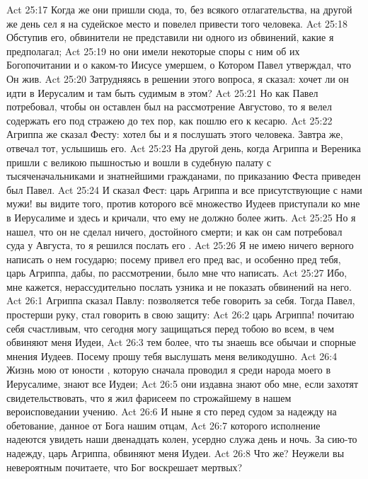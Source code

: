 \vs Act 25:17 Когда же они пришли сюда, то, без всякого отлагательства, на другой же день сел я на судейское место и повелел привести того человека.
\vs Act 25:18 Обступив его, обвинители не представили ни одного из обвинений, какие я предполагал;
\vs Act 25:19 но они имели некоторые споры с ним об их Богопочитании и о каком-то Иисусе умершем, о Котором Павел утверждал, что Он жив.
\vs Act 25:20 Затрудняясь в решении этого вопроса, я сказал: хочет ли он идти в Иерусалим и там быть судимым в этом?
\vs Act 25:21 Но как Павел потребовал, чтобы он оставлен был на рассмотрение Августово, то я велел содержать его под стражею до тех пор, как пошлю его к кесарю.
\vs Act 25:22 Агриппа же сказал Фесту: хотел бы и я послушать этого человека. Завтра же, отвечал тот, услышишь его.
\rsbpar\vs Act 25:23 На другой день, когда Агриппа и Вереника пришли с великою пышностью и вошли в судебную палату с тысяченачальниками и знатнейшими гражданами, по приказанию Феста приведен был Павел.
\vs Act 25:24 И сказал Фест: царь Агриппа и все присутствующие с нами мужи! вы видите того, против которого всё множество Иудеев приступали ко мне в Иерусалиме и здесь и кричали, что ему не должно более жить.
\vs Act 25:25 Но я нашел, что он не сделал ничего, достойного смерти; и как он сам потребовал суда у Августа, то я решился послать его .
\vs Act 25:26 Я не имею ничего верного написать о нем государю; посему привел его пред вас, и особенно пред тебя, царь Агриппа, дабы, по рассмотрении, было мне что написать.
\vs Act 25:27 Ибо, мне кажется, нерассудительно послать узника и не показать обвинений на него.
\vs Act 26:1 Агриппа сказал Павлу: позволяется тебе говорить за себя. Тогда Павел, простерши руку, стал говорить в свою защиту:
\vs Act 26:2 царь Агриппа! почитаю себя счастливым, что сегодня могу защищаться перед тобою во всем, в чем обвиняют меня Иудеи,
\vs Act 26:3 тем более, что ты знаешь все обычаи и спорные мнения Иудеев. Посему прошу тебя выслушать меня великодушно.
\vs Act 26:4 Жизнь мою от юности , которую сначала проводил я среди народа моего в Иерусалиме, знают все Иудеи;
\vs Act 26:5 они издавна знают обо мне, если захотят свидетельствовать, что я жил фарисеем по строжайшему в нашем вероисповедании учению.
\vs Act 26:6 И ныне я сто перед судом за надежду на обетование, данное от Бога нашим отцам,
\vs Act 26:7 которого исполнение надеются увидеть наши двенадцать колен, усердно служа  день и ночь. За сию-то надежду, царь Агриппа, обвиняют меня Иудеи.
\vs Act 26:8 Что же? Неужели вы невероятным почитаете, что Бог воскрешает мертвых?
